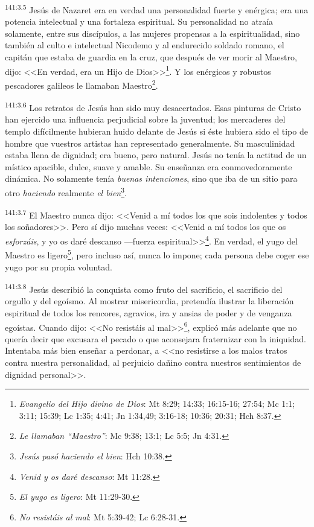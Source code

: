\par 
\textsuperscript{141:3.5} Jesús de Nazaret era en verdad una personalidad fuerte y enérgica; era una potencia intelectual y una fortaleza espiritual. Su personalidad no atraía solamente, entre sus discípulos, a las mujeres propensas a la espiritualidad, sino también al culto e intelectual Nicodemo y al endurecido soldado romano, el capitán que estaba de guardia en la cruz, que después de ver morir al Maestro, dijo: <<En verdad, era un Hijo de Dios>>\footnote{\textit{Evangelio del Hijo divino de Dios}: Mt 8:29; 14:33; 16:15-16; 27:54; Mc 1:1; 3:11; 15:39; Lc 1:35; 4:41; Jn 1:34,49; 3:16-18; 10:36; 20:31; Hch 8:37.}. Y los enérgicos y robustos pescadores galileos le llamaban Maestro\footnote{\textit{Le llamaban ``Maestro''}: Mc 9:38; 13:1; Lc 5:5; Jn 4:31.}.

\par 
\textsuperscript{141:3.6} Los retratos de Jesús han sido muy desacertados. Esas pinturas de Cristo han ejercido una influencia perjudicial sobre la juventud; los mercaderes del templo difícilmente hubieran huido delante de Jesús si éste hubiera sido el tipo de hombre que vuestros artistas han representado generalmente. Su masculinidad estaba llena de dignidad; era bueno, pero natural. Jesús no tenía la actitud de un místico apacible, dulce, suave y amable. Su enseñanza era conmovedoramente dinámica. No solamente tenía \textit{buenas intenciones}, sino que iba de un sitio para otro \textit{haciendo} realmente \textit{el bien}\footnote{\textit{Jesús pasó haciendo el bien}: Hch 10:38.}.

\par 
\textsuperscript{141:3.7} El Maestro nunca dijo: <<Venid a mí todos los que sois indolentes y todos los soñadores>>. Pero sí dijo muchas veces: <<Venid a mí todos los que os \textit{esforzáis}, y yo os daré descanso ---fuerza espiritual>>\footnote{\textit{Venid y os daré descanso}: Mt 11:28.}. En verdad, el yugo del Maestro es ligero\footnote{\textit{El yugo es ligero}: Mt 11:29-30.}, pero incluso así, nunca lo impone; cada persona debe coger ese yugo por su propia voluntad.

\par 
\textsuperscript{141:3.8} Jesús describió la conquista como fruto del sacrificio, el sacrificio del orgullo y del egoísmo. Al mostrar misericordia, pretendía ilustrar la liberación espiritual de todos los rencores, agravios, ira y ansias de poder y de venganza egoístas. Cuando dijo: <<No resistáis al mal>>\footnote{\textit{No resistáis al mal}: Mt 5:39-42; Lc 6:28-31.}, explicó más adelante que no quería decir que excusara el pecado o que aconsejara fraternizar con la iniquidad. Intentaba más bien enseñar a perdonar, a <<no resistirse a los malos tratos contra nuestra personalidad, al perjuicio dañino contra nuestros sentimientos de dignidad personal>>.

